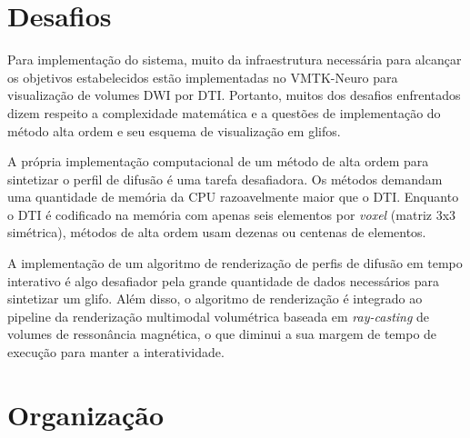 \documentclass[
    12pt,                %
    oneside,            %
    a4paper,            %
    english,            %
    french,                %
    spanish,            %
    brazil                %
    ]{abntex2}
\begin{document}




\section{Desafios}
\label{sec::desafios}

Para implementação do sistema, muito da infraestrutura necessária para alcançar os objetivos estabelecidos estão implementadas no VMTK-Neuro para visualização de volumes DWI por DTI. Portanto, muitos dos desafios enfrentados dizem respeito a complexidade matemática e a questões de implementação do método alta ordem e seu esquema de visualização em glifos.

A própria implementação computacional de um método de alta ordem para sintetizar o perfil de difusão é uma tarefa desafiadora. Os métodos demandam uma quantidade de memória da CPU razoavelmente maior que o DTI. Enquanto o DTI é codificado na memória com apenas seis elementos por \textit{voxel} (matriz 3x3 simétrica), métodos de alta ordem usam dezenas ou centenas de elementos. %

A implementação de um algoritmo de renderização de perfis de difusão em tempo interativo é algo desafiador pela grande quantidade de dados necessários para sintetizar um glifo. Além disso, o algoritmo de renderização é integrado ao pipeline da renderização multimodal volumétrica baseada em \textit{ray-casting} de volumes de ressonância magnética, o que diminui a sua margem de tempo de execução para manter a interatividade.


\section{Organização}
\label{sec:intro_organizacao}
\end{document}
